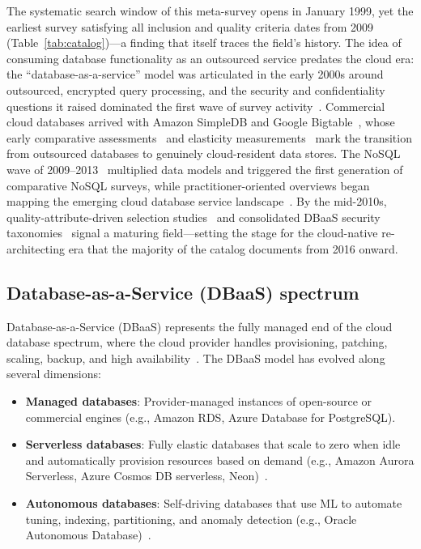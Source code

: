 \documentclass[a4paper,fleqn]{cas-sc}
\begin{document}
The systematic search window of this meta-survey opens in January 1999, yet the earliest survey satisfying all inclusion and quality criteria dates from 2009 (Table~\ref{tab:catalog})---a finding that itself traces the field's history. The idea of consuming database functionality as an outsourced service predates the cloud era: the ``database-as-a-service'' model was articulated in the early 2000s around outsourced, encrypted query processing, and the security and confidentiality questions it raised dominated the first wave of survey activity~\cite{Ferrari2009DBaaSSec,Kohler2015Sec}. Commercial cloud databases arrived with Amazon SimpleDB and Google Bigtable~\cite{Chang2008Bigtable}, whose early comparative assessments~\cite{Ramanathan2011SimpleDBBigtable} and elasticity measurements~\cite{Dory2011Elasticity} mark the transition from outsourced databases to genuinely cloud-resident data stores. The NoSQL wave of 2009--2013~\cite{Cattell2011Scalable,Han2011NoSQL} multiplied data models and triggered the first generation of comparative NoSQL surveys, while practitioner-oriented overviews began mapping the emerging cloud database service landscape~\cite{Deka2014CloudDBSurvey,Litchfield2014DBaaS,Arora2012CloudDB}. By the mid-2010s, quality-attribute-driven selection studies~\cite{Lourenco2015NoSQL} and consolidated DBaaS security taxonomies~\cite{Kohler2015Sec} signal a maturing field---setting the stage for the cloud-native re-architecting era that the majority of the catalog documents from 2016 onward.

\subsection{Database-as-a-Service (DBaaS) spectrum}
\label{subsec:dbaas}

Database-as-a-Service (DBaaS) represents the fully managed end of the cloud database spectrum, where the cloud provider handles provisioning, patching, scaling, backup, and high availability~\cite{Curino2011DBaaS,Lehner2010DBaaS,AlShehri2013DBaaS,Grolinger2013CloudData,Deka2014CloudDBSurvey}. The DBaaS model has evolved along several dimensions:

\begin{itemize}
    \item \textbf{Managed databases}: Provider-managed instances of open-source or commercial engines (e.g., Amazon RDS, Azure Database for PostgreSQL).
    \item \textbf{Serverless databases}: Fully elastic databases that scale to zero when idle and automatically provision resources based on demand (e.g., Amazon Aurora Serverless, Azure Cosmos DB serverless, Neon)~\cite{Muller2020Serverless}.
    \item \textbf{Autonomous databases}: Self-driving databases that use ML to automate tuning, indexing, partitioning, and anomaly detection (e.g., Oracle Autonomous Database)~\cite{Pavlo2017SelfDriving}.
\end{itemize}
\end{document}
